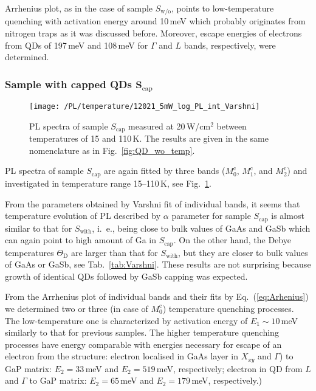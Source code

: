 Arrhenius plot, as in the case of sample $S_\mathrm{w/o}$, points to low-temperature quenching with activation energy around 10$\,$meV which probably originates from nitrogen traps as it was discussed before. Moreover, escape energies of electrons from QDs of 197$\,$meV and 108$\,$meV for $\Gamma$ and $L$ bands, respectively, were determined. 
%


\subsubsection*{Sample with capped QDs $\mathbf{S_\mathrm{cap}}$}
%
\begin{figure}[h]
	\centering
	\texttt{[image: /PL/temperature/12021\_5mW\_log\_PL\_int\_Varshni]}
	\caption{PL spectra of sample ${S_\mathrm{cap}}$ measured at 20$\,$W/cm$^2$ between temperatures of 15 and 110$\,$K. The results are given in the same nomenclature as in Fig.~\ref{fig:QD_wo_temp}.}
	\label{fig:QD_c_temp}
\end{figure}

PL spectra of sample ${S_\mathrm{cap}}$ are again fitted by three bands ($M_0^\mathrm{c}$, $M_1^\mathrm{c}$, and $M_2^\mathrm{c}$) and investigated in temperature range 15--110$\,$K, see Fig.~\ref{fig:QD_c_temp}.

From the parameters obtained by Varshni fit of individual bands, it seems that temperature evolution of PL described by $\alpha$ parameter for sample ${S_\mathrm{cap}}$ is almost similar to that for ${S_\mathrm{with}}$, i.~e., being close to bulk values of GaAs and GaSb which can again point to high amount of Ga in ${S_\mathrm{cap}}$. On the other hand, the Debye temperatures $\Theta_\mathrm{D}$ are larger than that for ${S_\mathrm{with}}$, but they are closer to bulk values of GaAs or GaSb, see Tab.~\ref{tab:Varshni}. These results are not surprising because growth of identical QDs followed by GaSb capping was expected.

From the Arrhenius plot of individual bands and their fits by Eq.~(\ref{eq:Arhenius}) we determined two or three (in case of $M_0^\mathrm{c}$) temperature quenching processes. The low-temperature one is characterized by activation energy of $E_1\sim 10$$\,$meV similarly to that for previous samples. The higher temperature quenching processes have energy comparable with energies necessary for escape of an electron from the structure: electron localised in GaAs layer in $X_{xy}$ and $\Gamma$) to GaP matrix: $E_2=33$$\,$meV and $E_2=519$$\,$meV, respectively; electron in QD from $L$ and $\Gamma$ to GaP matrix: $E_2=65$$\,$meV and $E_2=179$$\,$meV, respectively.)

